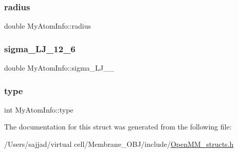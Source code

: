 \subsubsection{\texorpdfstring{radius}{radius}}
{\footnotesize\ttfamily double My\+Atom\+Info\+::radius}

\mbox{\label{structMyAtomInfo_a7a7974ff22785c7eb048f2e2f0a73ee8}} 
\subsubsection{\texorpdfstring{sigma\_LJ\_12\_6}{sigma\_LJ\_12\_6}}
{\footnotesize\ttfamily double My\+Atom\+Info\+::sigma\+\_\+\+L\+J\+\_\+\_}

\mbox{\label{structMyAtomInfo_aed11c9319e0ba5fd5d1d853393e5ca2a}} 
\subsubsection{\texorpdfstring{type}{type}}
{\footnotesize\ttfamily int My\+Atom\+Info\+::type}



The documentation for this struct was generated from the following file\+:\begin{DoxyCompactItemize}
\item 
/\+Users/sajjad/virtual cell/\+Membrane\+\_\+\+O\+B\+J/include/\mbox{\hyperlink{OpenMM__structs_8h}{Open\+M\+M\+\_\+structs.\+h}}\end{DoxyCompactItemize}
